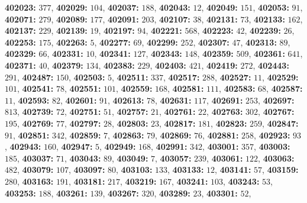 \textsf{\bfseries 402023:} $377$, \textsf{\bfseries 402029:} $104$, \textsf{\bfseries 402037:} $188$, \textsf{\bfseries 402043:} $12$, \textsf{\bfseries 402049:} $151$, \textsf{\bfseries 402053:} $91$, \textsf{\bfseries 402071:} $279$, \textsf{\bfseries 402089:} $177$, \textsf{\bfseries 402091:} $203$, \textsf{\bfseries 402107:} $38$, \textsf{\bfseries 402131:} $73$, \textsf{\bfseries 402133:} $162$, \textsf{\bfseries 402137:} $229$, \textsf{\bfseries 402139:} $19$, \textsf{\bfseries 402197:} $94$, \textsf{\bfseries 402221:} $568$, \textsf{\bfseries 402223:} $42$, \textsf{\bfseries 402239:} $26$, \textsf{\bfseries 402253:} $175$, \textsf{\bfseries 402263:} $5$, \textsf{\bfseries 402277:} $69$, \textsf{\bfseries 402299:} $252$, \textsf{\bfseries 402307:} $47$, \textsf{\bfseries 402313:} $89$, \textsf{\bfseries 402329:} $66$, \textsf{\bfseries 402331:} $10$, \textsf{\bfseries 402341:} $127$, \textsf{\bfseries 402343:} $148$, \textsf{\bfseries 402359:} $509$, \textsf{\bfseries 402361:} $641$, \textsf{\bfseries 402371:} $40$, \textsf{\bfseries 402379:} $134$, \textsf{\bfseries 402383:} $229$, \textsf{\bfseries 402403:} $421$, \textsf{\bfseries 402419:} $272$, \textsf{\bfseries 402443:} $291$, \textsf{\bfseries 402487:} $150$, \textsf{\bfseries 402503:} $5$, \textsf{\bfseries 402511:} $337$, \textsf{\bfseries 402517:} $288$, \textsf{\bfseries 402527:} $11$, \textsf{\bfseries 402529:} $101$, \textsf{\bfseries 402541:} $78$, \textsf{\bfseries 402551:} $101$, \textsf{\bfseries 402559:} $168$, \textsf{\bfseries 402581:} $111$, \textsf{\bfseries 402583:} $68$, \textsf{\bfseries 402587:} $11$, \textsf{\bfseries 402593:} $82$, \textsf{\bfseries 402601:} $91$, \textsf{\bfseries 402613:} $78$, \textsf{\bfseries 402631:} $117$, \textsf{\bfseries 402691:} $253$, \textsf{\bfseries 402697:} $813$, \textsf{\bfseries 402739:} $72$, \textsf{\bfseries 402751:} $51$, \textsf{\bfseries 402757:} $21$, \textsf{\bfseries 402761:} $22$, \textsf{\bfseries 402763:} $302$, \textsf{\bfseries 402767:} $195$, \textsf{\bfseries 402769:} $77$, \textsf{\bfseries 402797:} $28$, \textsf{\bfseries 402803:} $23$, \textsf{\bfseries 402817:} $181$, \textsf{\bfseries 402823:} $259$, \textsf{\bfseries 402847:} $91$, \textsf{\bfseries 402851:} $342$, \textsf{\bfseries 402859:} $7$, \textsf{\bfseries 402863:} $79$, \textsf{\bfseries 402869:} $76$, \textsf{\bfseries 402881:} $258$, \textsf{\bfseries 402923:} $93$, \textsf{\bfseries 402943:} $160$, \textsf{\bfseries 402947:} $5$, \textsf{\bfseries 402949:} $168$, \textsf{\bfseries 402991:} $342$, \textsf{\bfseries 403001:} $357$, \textsf{\bfseries 403003:} $185$, \textsf{\bfseries 403037:} $71$, \textsf{\bfseries 403043:} $89$, \textsf{\bfseries 403049:} $7$, \textsf{\bfseries 403057:} $239$, \textsf{\bfseries 403061:} $122$, \textsf{\bfseries 403063:} $482$, \textsf{\bfseries 403079:} $107$, \textsf{\bfseries 403097:} $80$, \textsf{\bfseries 403103:} $133$, \textsf{\bfseries 403133:} $12$, \textsf{\bfseries 403141:} $57$, \textsf{\bfseries 403159:} $280$, \textsf{\bfseries 403163:} $191$, \textsf{\bfseries 403181:} $217$, \textsf{\bfseries 403219:} $167$, \textsf{\bfseries 403241:} $103$, \textsf{\bfseries 403243:} $53$, \textsf{\bfseries 403253:} $188$, \textsf{\bfseries 403261:} $139$, \textsf{\bfseries 403267:} $320$, \textsf{\bfseries 403289:} $23$, \textsf{\bfseries 403301:} $52$, 
